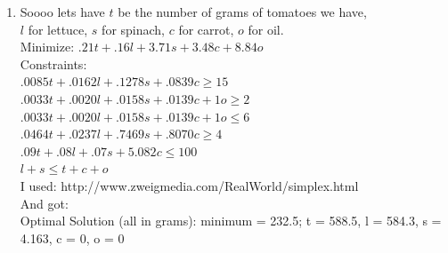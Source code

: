 \documentclass[11pt]{article}
\begin{document}
\begin{enumerate}
\begin{enumerate}
\end{enumerate}
\newpage
\item Soooo lets have $t$ be the number of grams of tomatoes we have,\\
$l$ for lettuce, $s$ for spinach, $c$ for carrot, $o$ for oil.\\
Minimize: $.21t+.16l+3.71s+3.48c+8.84o$\\
Constraints:\\
$.0085t+.0162l+.1278s+.0839c\ge 15$\\
$.0033t+.0020l+.0158s+.0139c+1o\ge 2$\\
$.0033t+.0020l+.0158s+.0139c+1o\le 6$\\
$.0464t+.0237l+.7469s+.8070c\ge 4$\\
$.09t+.08l+.07s+5.082c \le 100$\\
$l+s\le t+c+o$\\
I used: http://www.zweigmedia.com/RealWorld/simplex.html\\
And got:\\
Optimal Solution (all in grams): minimum = 232.5; t = 588.5, l = 584.3, s = 4.163, c = 0, o = 0
\end{enumerate}
\end{document}
